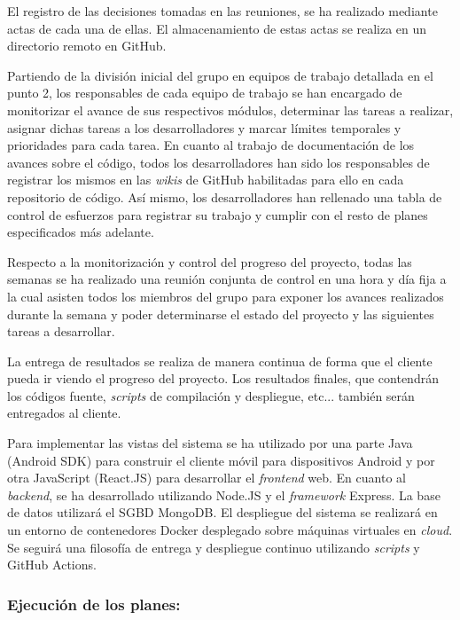 \documentclass{article}
\begin{document}
El registro de las decisiones tomadas en las reuniones, se ha realizado mediante actas de cada una de ellas. El almacenamiento de estas actas se realiza en un directorio remoto en GitHub.

Partiendo de la división inicial del grupo en equipos de trabajo detallada en el punto 2, los responsables de cada equipo de trabajo se han encargado de monitorizar el avance de sus respectivos módulos, determinar las tareas a realizar, asignar dichas tareas a los desarrolladores y marcar límites temporales y prioridades para cada tarea. En cuanto al trabajo de documentación de los avances sobre el código, todos los desarrolladores han sido los responsables de registrar los mismos en las \textit{wikis} de GitHub habilitadas para ello en cada repositorio de código. Así mismo, los desarrolladores han rellenado una tabla de control de esfuerzos para registrar su trabajo y cumplir con el resto de planes especificados más adelante.

\pagebreak

Respecto a la monitorización y control del progreso del proyecto, todas las semanas se ha realizado una reunión conjunta de control en una hora y día fija a la cual asisten todos los miembros del grupo para exponer los avances realizados durante la semana y poder determinarse el estado del proyecto y las siguientes tareas a desarrollar.

La entrega de resultados se realiza de manera continua de forma que el cliente pueda ir viendo el progreso del proyecto. Los resultados finales, que contendrán los códigos fuente, \textit{scripts} de compilación y despliegue, etc... también serán entregados al cliente.

Para implementar las vistas del sistema se ha utilizado por una parte Java (Android SDK) para construir el cliente móvil para dispositivos Android y por otra JavaScript (React.JS) para desarrollar el \textit{frontend} web. En cuanto al \textit{backend}, se ha desarrollado utilizando Node.JS y el \textit{framework} Express. La base de datos utilizará el SGBD MongoDB. El despliegue del sistema se realizará en un entorno de contenedores Docker desplegado sobre máquinas virtuales en \textit{cloud}. Se seguirá una filosofía de entrega y despliegue continuo utilizando \textit{scripts} y GitHub Actions.

\subsubsection*{Ejecución de los planes:}
\end{document}
